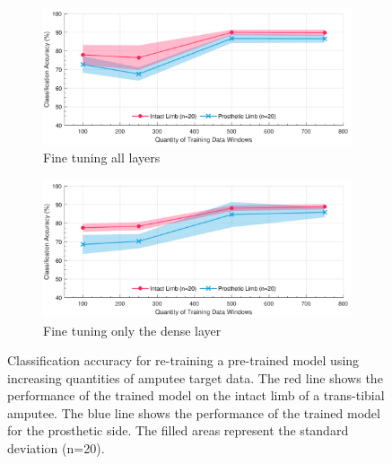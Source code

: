 \begin{figure}[!hbtp]
    \centering
    \begin{subfigure}{\textwidth}
        \centering
        \includegraphics[width=\textwidth]{content/6-Amputee/ch6_pre_trained_model_accuracy.pdf}
        \caption{Fine tuning all layers}
    \end{subfigure}
    \begin{subfigure}{\textwidth}
        \centering
        \includegraphics[width=\textwidth]{content/6-Amputee/ch6_frozen_lstm_layer_accuracy.pdf}
        \caption{Fine tuning only the dense layer}
    \end{subfigure}
    \caption[Accuracy of re-training a pre-trained model using amputee target data]{Classification accuracy for re-training a pre-trained model using increasing quantities of amputee target data. The red line shows the performance of the trained model on the intact limb of a trans-tibial amputee. The blue line shows the performance of the trained model for the prosthetic side. The filled areas represent the standard deviation (n=20).}
    \label{fig:ch6-amputee-retrain-pre-trained}
\end{figure}
